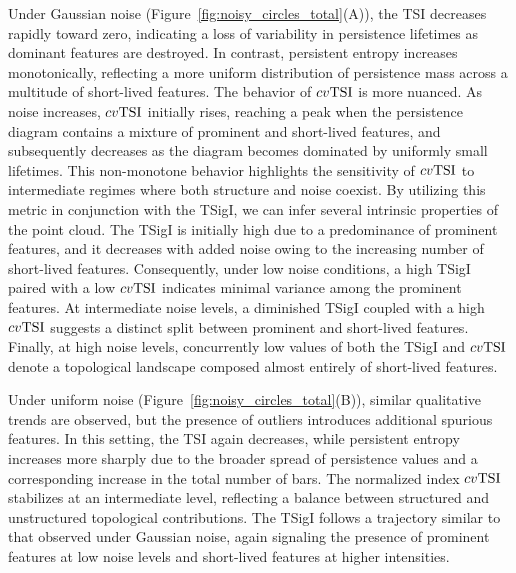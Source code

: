 \documentclass[11pt]{amsart}
\theoremstyle{definition}
\newcommand{\tsi}[0]{\textup{TSI}}
\begin{document}

Under Gaussian noise (Figure~\ref{fig:noisy_circles_total}(A)), the TSI decreases rapidly toward zero, indicating a loss of variability in persistence lifetimes as dominant features are destroyed. In contrast, persistent entropy increases monotonically, reflecting a more uniform distribution of persistence mass across a multitude of short-lived features. The behavior of $cv\tsi$ is more nuanced. As noise increases, $cv\tsi$ initially rises, reaching a peak when the persistence diagram contains a mixture of prominent and short-lived features, and subsequently decreases as the diagram becomes dominated by uniformly small lifetimes. This non-monotone behavior highlights the sensitivity of $cv\tsi$ to intermediate regimes where both structure and noise coexist. By utilizing this metric in conjunction with the TSigI, we can infer several intrinsic properties of the point cloud. The TSigI is initially high due to a predominance of prominent features, and it decreases with added noise owing to the increasing number of short-lived features. Consequently, under low noise conditions, a high TSigI paired with a low $cv\tsi$ indicates minimal variance among the prominent features. At intermediate noise levels, a diminished TSigI coupled with a high $cv\tsi$ suggests a distinct split between prominent and short-lived features. Finally, at high noise levels, concurrently low values of both the TSigI and $cv\tsi$ denote a topological landscape composed almost entirely of short-lived features.

Under uniform noise (Figure~\ref{fig:noisy_circles_total}(B)), similar qualitative trends are observed, but the presence of outliers introduces additional spurious features. In this setting, the TSI again decreases, while persistent entropy increases more sharply due to the broader spread of persistence values and a corresponding increase in the total number of bars. The normalized index $cv\tsi$ stabilizes at an intermediate level, reflecting a balance between structured and unstructured topological contributions. The TSigI follows a trajectory similar to that observed under Gaussian noise, again signaling the presence of prominent features at low noise levels and short-lived features at higher intensities.
\end{document}

